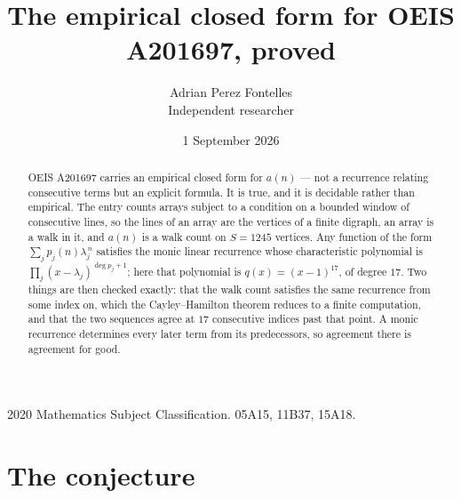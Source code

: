\documentclass[11pt,a4paper]{article}
\title{The empirical closed form for OEIS A201697, proved}
\author{Adrian Perez Fontelles\\ \small Independent researcher}
\date{1 September 2026}
\theoremstyle{plain}
\theoremstyle{definition}
\begin{document}
\maketitle

\begin{abstract}
OEIS A201697 carries an empirical closed form for $a(n)$ --- not a recurrence relating
consecutive terms but an explicit formula. It is true, and it is decidable rather than
empirical. The entry counts arrays subject to a condition on a bounded window of consecutive lines, so the lines of an array are the
vertices of a finite digraph, an array is a walk in it, and $a(n)$ is a walk count on
$S=1245$ vertices. Any function of the form $\sum_j p_j(n)\lambda_j^{\,n}$ satisfies the
monic linear recurrence whose characteristic polynomial is
$\prod_j(x-\lambda_j)^{\deg p_j+1}$; here that polynomial is $q(x)=(x-1)^{17}$, of degree
$17$. Two things are then checked exactly: that the walk count satisfies the same
recurrence from some index on, which the Cayley--Hamilton theorem reduces to a finite
computation, and that the two sequences agree at $17$ consecutive indices past that
point. A monic recurrence determines every later term from its predecessors, so agreement
there is agreement for good.
\end{abstract}

\noindent\small 2020 Mathematics Subject Classification. 05A15, 11B37, 15A18.\normalsize

\section{The conjecture}
\end{document}
